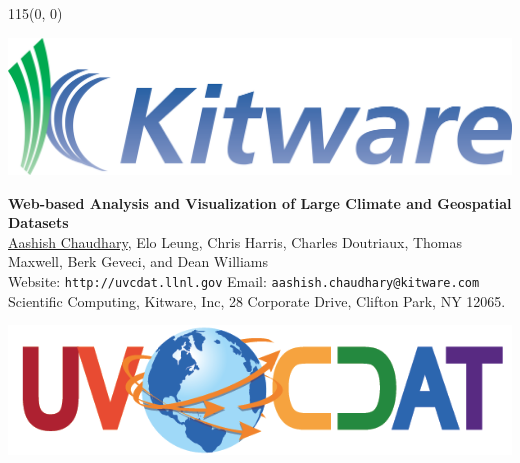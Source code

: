 \documentclass[a0,landscape]{a0poster}
\newenvironment{pcol}[1]{
  \begin{minipage}[t]{#1}
}{
  \end{minipage}
}
\newcommand{\pbox}[4]{
\begin{minipage}[t][#2][t]{#1}
#4
\end{minipage}
}%
\begin{document}
\begin{textblock}{115}(0, 0)
\begin{pcol}{\headerwidth}
\begin{minipage}[c][\headerheight][c]{0.1\textwidth}
  \begin{center}
    \includegraphics[width=1.0\textwidth]{images/Kitware}
  \end{center}
\end{minipage}
\begin{minipage}[c][\headerheight][c]{0.755\textwidth}
  \begin{center}
    {\Huge \textbf{Web-based Analysis and Visualization of Large Climate and Geospatial Datasets}}\\[10mm]
    {\Large \underline{Aashish Chaudhary}, Elo Leung, Chris Harris, Charles Doutriaux, Thomas Maxwell, Berk Geveci, and Dean Williams}\\[6.5mm]
    {\large Website: \texttt{http://uvcdat.llnl.gov}\hspace*{1.5cm} Email: \texttt{aashish.chaudhary@kitware.com}}\\[6.5mm]
    {\large Scientific Computing, Kitware, Inc, 28 Corporate Drive, Clifton Park, NY 12065.}
  \end{center}
\end{minipage}
\begin{minipage}[c][\headerheight][c]{0.1\textwidth}
  \begin{center}
    \includegraphics[width=1.5\textwidth]{images/UV-CDAT_logo}
  \end{center}
\end{minipage}
\end{pcol}
\end{textblock}
\end{document}
